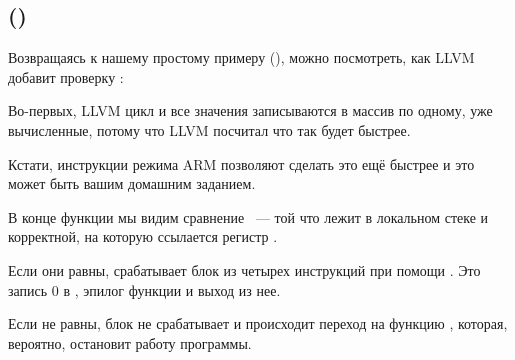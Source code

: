 \subsection{\OptimizingXcodeIV (\ThumbTwoMode)}

Возвращаясь к нашему простому примеру
 (),
можно посмотреть, как LLVM добавит проверку :



Во-первых, LLVM  цикл и все значения записываются в массив по одному, 
уже вычисленные, потому что LLVM посчитал что так будет быстрее.

Кстати, инструкции режима ARM позволяют сделать это ещё быстрее и это может быть вашим 
домашним заданием.

В конце функции мы видим сравнение ~--- той что лежит в локальном стеке и корректной, 
на которую ссылается регистр .

Если они равны, срабатывает блок из четырех инструкций при помощи .
Это запись 0 в , эпилог функции и выход из нее.

Если  не равны, блок не срабатывает и происходит
переход на функцию , которая, вероятно, остановит работу программы.


